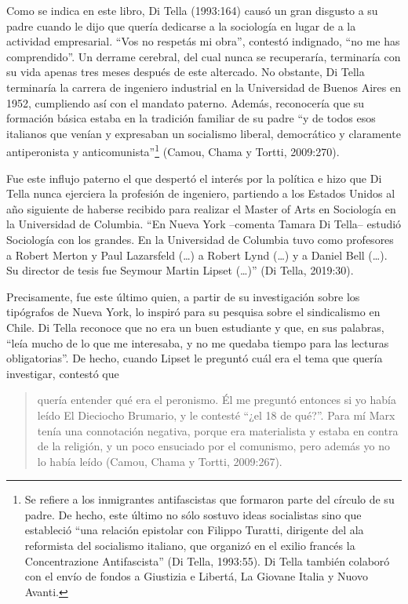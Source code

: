 Como se indica en este libro, Di Tella (1993:164) causó un gran disgusto a su padre cuando le dijo que quería dedicarse a la sociología en lugar de a la actividad empresarial. \enquote{Vos no respetás mi obra}, contestó indignado, \enquote{no me has comprendido}. Un derrame cerebral, del cual nunca se recuperaría, terminaría con su vida apenas tres meses después de este altercado. No obstante, Di Tella terminaría la carrera de ingeniero industrial en la Universidad de Buenos Aires en 1952, cumpliendo así con el mandato paterno. Además, reconocería que su formación básica estaba en la tradición familiar de su padre \enquote{y de todos esos italianos que venían y expresaban un socialismo liberal, democrático y claramente antiperonista y anticomunista}\footnote{Se refiere a los inmigrantes antifascistas que formaron parte del círculo de su padre. De hecho, este último no sólo sostuvo ideas socialistas sino que estableció \enquote{una relación epistolar con Filippo Turatti, dirigente del ala reformista del socialismo italiano, que organizó en el exilio francés la Concentrazione Antifascista} (Di Tella, 1993:55). Di Tella también colaboró con el envío de fondos a Giustizia e Libertá, La Giovane Italia y Nuovo Avanti.} (Camou, Chama y Tortti, 2009:270).

Fue este influjo paterno el que despertó el interés por la política e hizo que Di Tella nunca ejerciera la profesión de ingeniero, partiendo a los Estados Unidos al año siguiente de haberse recibido para realizar el Master of Arts en Sociología en la Universidad de Columbia. \enquote{En Nueva York --comenta Tamara Di Tella-- estudió Sociología con los grandes. En la Universidad de Columbia tuvo como profesores a Robert Merton y Paul Lazarsfeld (\dots) a Robert Lynd (\dots) y a Daniel Bell (\dots). Su director de tesis fue Seymour Martin Lipset (\dots)} (Di Tella, 2019:30).

Precisamente, fue este último quien, a partir de su investigación sobre los tipógrafos de Nueva York, lo inspiró para su pesquisa sobre el sindicalismo en Chile. Di Tella reconoce que no era un buen estudiante y que, en sus palabras, \enquote{leía mucho de lo que me interesaba, y no me quedaba tiempo para las lecturas obligatorias}. De hecho, cuando Lipset le preguntó cuál era el tema que quería investigar, contestó que

\begin{quote}
quería entender qué era el peronismo. Él me preguntó entonces si yo había leído El Dieciocho Brumario, y le contesté \enquote{¿el 18 de qué?}. Para mí Marx tenía una connotación negativa, porque era materialista y estaba en contra de la religión, y un poco ensuciado por el comunismo, pero además yo no lo había leído (Camou, Chama y Tortti, 2009:267).
\end{quote}

